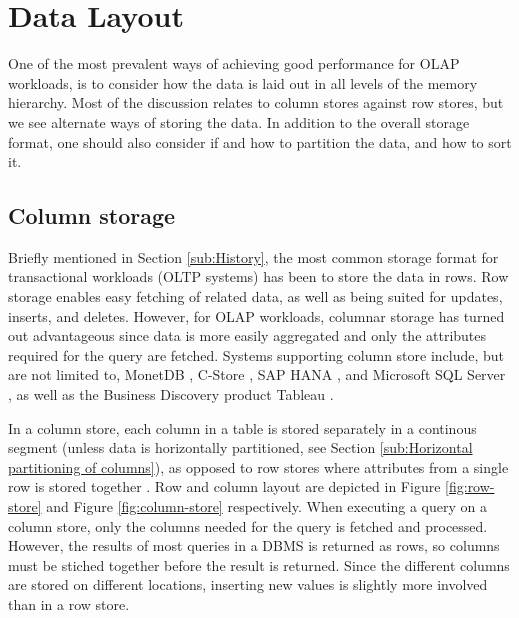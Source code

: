 \chapter{Data Layout}
\label{chap:Data Layout}
One of the most prevalent ways of achieving good performance for OLAP workloads, is to consider how the data is laid out in all levels of the memory hierarchy. Most of the discussion relates to column stores against row stores, but we see alternate ways of storing the data. In addition to the overall storage format, one should also consider if and how to partition the data, and how to sort it.
\newpage

\section{Column storage}
\label{sec:Column storage}
Briefly mentioned in Section \ref{sub:History}, the most common storage format for transactional workloads (OLTP systems) has been to store the data in rows. Row storage enables easy fetching of related data, as well as being suited for updates, inserts, and deletes. However, for OLAP workloads, columnar storage has turned out advantageous since data is more easily aggregated and only the attributes required for the query are fetched. Systems supporting column store include, but are not limited to, MonetDB \cite{Boncz2002-yj, Boncz2005-wj}, C-Store \cite{Stonebraker2005-qz}, SAP HANA \cite{Farber2012-vh}, and Microsoft SQL Server \cite{Larson2013-mc, noauthor_undated-vq}, as well as the Business Discovery product Tableau \cite{Kamkolkar2015-iq}. 

In a column store, each column in a table is stored separately in a continous segment (unless data is horizontally partitioned, see Section \ref{sub:Horizontal partitioning of columns}), as opposed to row stores where attributes from a single row is stored together \cite{Bjorklund2011-wh}. Row and column layout are depicted in Figure \ref{fig:row-store} and Figure \ref{fig:column-store} respectively. When executing a query on a column store, only the columns needed for the query is fetched and processed. However, the results of most queries in a DBMS is returned as rows, so columns must be stiched together before the result is returned. Since the different columns are stored on different locations, inserting new values is slightly more involved than in a row store. 

